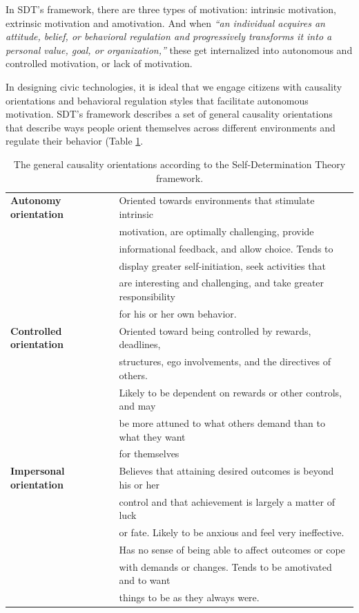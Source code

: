 In SDT's framework, there are three types of motivation: intrinsic motivation, extrinsic motivation and amotivation. And when \textit{``an individual acquires an attitude, belief, or behavioral regulation and progressively transforms it into a personal value, goal, or organization,''}\cite{ryan2000intrinsic} these get internalized into autonomous and controlled motivation, or lack of motivation. 

In designing civic technologies, it is ideal that we engage citizens with causality orientations and behavioral regulation styles that facilitate autonomous motivation. SDT's framework describes a set of general causality orientations that describe ways people orient themselves across different environments and regulate their behavior (Table \ref{tab:gcos}. 

\begin{table}[h]
    \caption{The general causality orientations according to the Self-Determination Theory framework.}
	\label{tab:gcos}
	\centering
	\begin{tabular}{l l}
	    \hline\hline
		\textbf{Autonomy orientation} & Oriented towards environments that stimulate intrinsic \\
        & motivation, are optimally challenging, provide \\
        & informational feedback, and allow choice. Tends to \\
        & display greater self-initiation, seek activities that \\
        & are interesting and challenging, and take greater responsibility \\
        & for his or her own behavior. \\
        \textbf{Controlled orientation} & Oriented toward being controlled by rewards, deadlines, \\
        & structures, ego involvements, and the directives of others. \\
        & Likely to be dependent on rewards or other controls, and may \\
        & be more attuned to what others demand than to what they want \\
        & for themselves \\
        \textbf{Impersonal orientation} & Believes that attaining desired outcomes is beyond his or her \\
        & control and that achievement is largely a matter of luck \\
        & or fate. Likely to be anxious and feel very ineffective. \\
        & Has no sense of being able to affect outcomes or cope \\ 
        & with demands or changes. Tends to be amotivated and to want \\
        & things to be as they always were. \\
		\hline
	\end{tabular}
\end{table}

